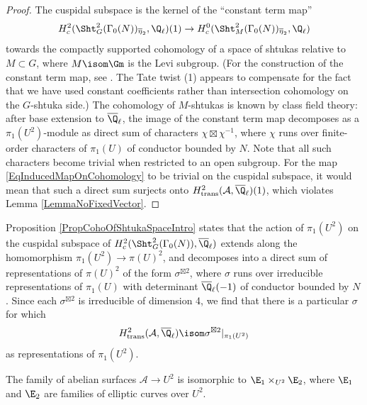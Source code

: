 \documentclass{article}
\begin{document}
\begin{proof}  The cuspidal subspace is the kernel of the ``constant term map'' 
\[ H^2_c(\Sht_G^2(\Gamma_0(N))_{\overline{\eta}_2},\Q_\ell)(1)\to H^0_c(\Sht_M^2(\Gamma_0(N))_{\overline{\eta}_2},\Q_\ell)\]
towards the compactly supported cohomology of a space of shtukas relative to $M\subset G$, where $M\isom \Gm$ is the Levi subgroup. (For the construction of the constant term map, see \cite{Xue}.  The Tate twist (1) appears to compensate for the fact that we have used constant coefficients rather than intersection cohomology on the $G$-shtuka side.)  The cohomology of $M$-shtukas is known by class field theory:  after base extension to $\overline{\Q}_\ell$,  the image of the constant term map decomposes as a $\pi_1(U^2)$-module as direct sum of characters $\chi\boxtimes \chi^{-1}$, where $\chi$ runs over finite-order characters of $\pi_1(U)$ of conductor bounded by $N$.    Note that all such characters become trivial when restricted to an open subgroup.  For the map  \eqref{EqInducedMapOnCohomology} to be trivial on the cuspidal subspace, it would mean that such a direct sum surjects onto $H^2_{\text{trans}}(\mathcal{A},\overline{\Q}_\ell)(1)$, which violates Lemma \ref{LemmaNoFixedVector}.  
\end{proof}

Proposition \ref{PropCohoOfShtukaSpaceIntro} states that the action of $\pi_1(U^2)$ on the cuspidal subspace of $H^2_c(\Sht_G^2(\Gamma_0(N)),\overline{\Q}_\ell)$ extends along the homomorphism $\pi_1(U^2)\to \pi(U)^2$, and decomposes into a direct sum of representations of $\pi(U)^2$ of the form $\sigma^{\boxtimes 2}$, where $\sigma$ runs over irreducible representations of $\pi_1(U)$ with determinant $\overline{\Q}_\ell(-1)$ of conductor bounded by $N$.  Since each $\sigma^{\boxtimes 2}$ is irreducible of dimension 4, we find that there is a particular $\sigma$ for which 
\begin{equation}
    \label{EqIsomPi1}
 H^2_{\text{trans}}(\mathcal{A},\overline{\Q}_\ell) \isom \sigma^{\boxtimes 2}\vert_{\pi_1(U^2)}
 \end{equation}
as representations of $\pi_1(U^2)$.

\begin{lemma} \label{LemmaASplits} The family of abelian surfaces $\mathcal{A}\to U^2$ is isomorphic to $\E_1\times_{U^2} \E_2$, where $\E_1$ and $\E_2$ are families of elliptic curves over $U^2$.
\end{lemma}
\end{document}
